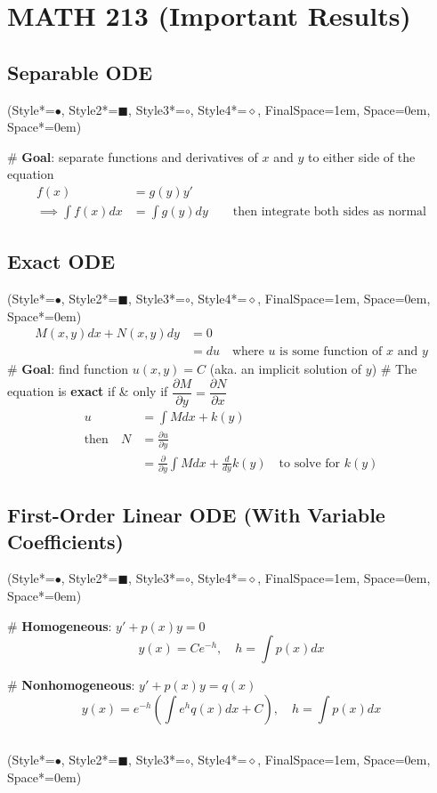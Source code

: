 \documentclass[11pt, oneside]{article}
\newcommand*{\begineasylist}{\begin{easylist}[itemize]\ListProperties(Style*=$\bullet$\quad, Style2*=\tiny$\blacksquare$\quad, Style3*=$\circ$\quad, Style4*=$\diamond$\quad, FinalSpace=1em, Space=0em, Space*=0em)}
\begin{document}
\section*{MATH 213 (Important Results)}

\subsection*{Separable ODE}
\begineasylist

# \textbf{Goal}: separate functions and derivatives of $x$ and $y$ to either side of the equation
\begin{align*}
f(x) &= g(y)y'\\
\implies \int f(x)dx &= \int g(y)dy \qquad \text{then integrate both sides as normal}
\end{align*}

\end{easylist}
\subsection*{Exact ODE}
\begineasylist
\begin{align*}
M(x,y)dx + N(x,y)dy &= 0\\
&= du \quad \text{where $u$ is some function of $x$ and $y$}
\end{align*}
# \textbf{Goal}: find function $u(x,y) = C$ (aka. an implicit solution of $y$)
# The equation is \textbf{exact} if \& only if $\dfrac{\partial M}{\partial y} = \dfrac{\partial N}{\partial x}$
\begin{align*}
u &= \int Mdx + k(y)\\
\text{then} \quad N &= \frac{\partial u}{\partial y}\\
& = \frac{\partial}{\partial y} \int Mdx + \frac{d}{dy}k(y) \quad \text{to solve for $k(y)$}
\end{align*}


\end{easylist}
\subsection*{First-Order Linear ODE (With Variable Coefficients)}
\begineasylist

# \textbf{Homogeneous}: $y' + p(x)y = 0$
\[ y(x) = Ce^{-h}, \quad h = \int p(x)dx \]

# \textbf{Nonhomogeneous}: $y' + p(x)y = q(x)$
\[ y(x) = e^{-h}(\int e^hq(x)dx + C), \quad h = \int p(x)dx \]

\end{easylist}
\subsection*{}
\begineasylist

\end{easylist}
\end{document}
